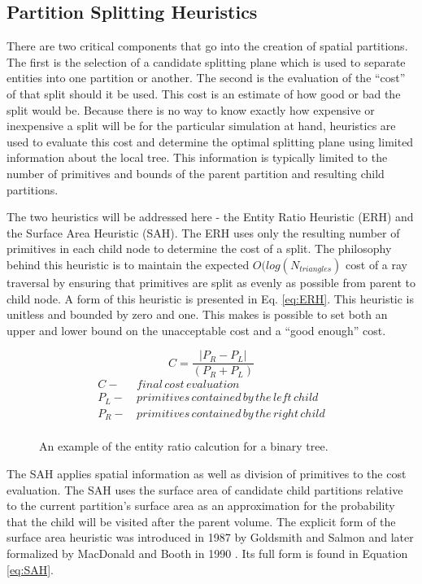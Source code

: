 \subsection{Partition Splitting Heuristics}

There are two critical components that go into the creation of spatial
partitions. The first is the selection of a candidate splitting plane which is
used to separate entities into one partition or another. The second is
the evaluation of the ``cost'' of that split should it be used. This cost is an
estimate of how good or bad the split would be. Because there is no way to know
exactly how expensive or inexpensive a split will be for the particular
simulation at hand, heuristics are used to evaluate this cost and determine the
optimal splitting plane using limited information about the local tree. This
information is typically limited to the number of primitives and bounds of the
parent partition and resulting child partitions.

The two heuristics will be addressed here - the Entity Ratio Heuristic (ERH) and the
Surface Area Heuristic (SAH). The ERH uses only the resulting number of
primitives in each child node to determine the cost of a split. The philosophy
behind this heuristic is to maintain the expected $O(log(N_{triangles})$ cost of
a ray traversal by ensuring that primitives are split as evenly as possible from
parent to child node. A form of this heuristic is presented in
Eq. \ref{eq:ERH}. This heuristic is unitless and bounded by zero and
one. This makes is possible to set both an upper and lower bound on the
unacceptable cost and a ``good enough'' cost.

\begin{figure}[H]
\begin{equation}
\label{eq:ERH}
 C = \frac{|P_{R}-P_{L}|}{(P_{R} + P_{L})} 
\end{equation}
  \begin{align*}
    C - & \,final \, cost \, evaluation \\
    P_{L} - & \, primitives\, contained\, by\, the\, left\, child  \\
    P_{R} - & \, primitives\, contained\, by\, the\, right\, child \\
  \end{align*}
  \caption{An example of the entity ratio calcution for a binary tree.}
  \label{fig:ERH}
\end{figure}

The SAH applies spatial information as well as division of primitives to the
cost evaluation. The SAH uses the surface area of candidate child partitions
relative to the current partition's surface area as an approximation for the
probability that the child will be visited after the parent volume. The explicit
form of the surface area heuristic was introduced in 1987 by Goldsmith and
Salmon \cite{Goldsmith_1987} and later formalized by MacDonald and Booth in 1990
\cite{MacDonald_1990}. Its full form is found in Equation \ref{eq:SAH}.

